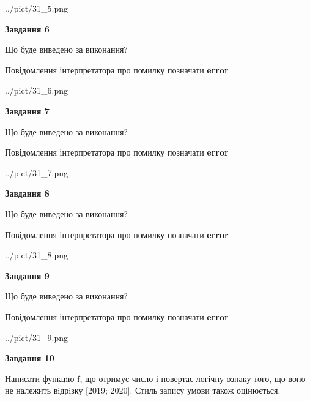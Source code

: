 \documentclass[12pt, ukrainian]{article}
\begin{document}
{\begin {large}
\begin{center}
	{../pict/31_5.png}
\end{center}
\newpage

{\begin {center}\textbf{Завдання 6}\end {center}}\par
Що буде виведено за виконання? \par
Повідомлення інтерпретатора про помилку позначати \textbf{error}

\begin{center}
	{../pict/31_6.png}
\end{center}
\newpage

{\begin {center}\textbf{Завдання 7}\end {center}}\par
Що буде виведено за виконання? \par
Повідомлення інтерпретатора про помилку позначати \textbf{error}

\begin{center}
	{../pict/31_7.png}
\end{center}
\newpage

{\begin {center}\textbf{Завдання 8}\end {center}}\par
Що буде виведено за виконання? \par
Повідомлення інтерпретатора про помилку позначати \textbf{error}

\begin{center}
	{../pict/31_8.png}
\end{center}
\newpage

{\begin {center}\textbf{Завдання 9}\end {center}}\par
Що буде виведено за виконання? \par
Повідомлення інтерпретатора про помилку позначати \textbf{error}

\begin{center}
	{../pict/31_9.png}
\end{center}
\newpage

{\begin {center}\textbf{Завдання 10}\end {center}}\par

Написати функцiю f, що отримує число і повертає логічну ознаку того, що воно не належить вiдрiзку [2019; 2020]. Стиль запису умови також оцінюється.\par
\newpage

\end {large}}
\end{document}
